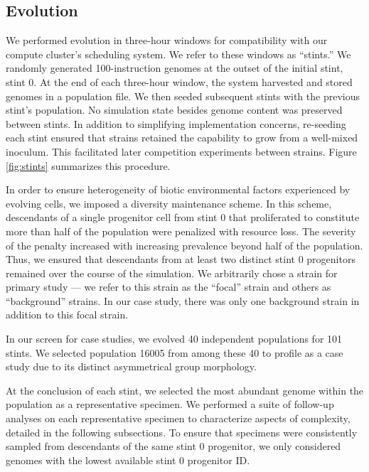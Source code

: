 
\subsection{Evolution}
\label{sec:evolution;ch:measuring-cna}



We performed evolution in three-hour windows for compatibility with our compute cluster's scheduling system.
We refer to these windows as ``stints.''
We randomly generated 100-instruction genomes at the outset of the initial stint, stint 0.
At the end of each three-hour window, the system harvested and stored genomes in a population file.
We then seeded subsequent stints with the previous stint's population.
No simulation state besides genome content was preserved between stints.
In addition to simplifying implementation concerns, re-seeding each stint ensured that strains retained the capability to grow from a well-mixed inoculum.
This facilitated later competition experiments between strains.
Figure \ref{fig:stints} summarizes this procedure.

In order to ensure heterogeneity of biotic environmental factors experienced by evolving cells, we imposed a diversity maintenance scheme.
In this scheme, descendants of a single progenitor cell from stint 0 that proliferated to constitute more than half of the population were penalized with resource loss.
The severity of the penalty increased with increasing prevalence beyond half of the population.
Thus, we ensured that descendants from at least two distinct stint 0 progenitors remained over the course of the simulation.
We arbitrarily chose a strain for primary study --- we refer to this strain as the ``focal'' strain and others as ``background'' strains.
In our case study, there was only one background strain in addition to this focal strain.

In our screen for case studies, we evolved 40 independent populations for 101 stints.
We selected population 16005 from among these 40 to profile as a case study due to its distinct asymmetrical group morphology.

At the conclusion of each stint, we selected the most abundant genome within the population as a representative specimen.
We performed a suite of follow-up analyses on each representative specimen to characterize aspects of complexity, detailed in the following subsections.
To ensure that specimens were consistently sampled from descendants of the same stint 0 progenitor, we only considered genomes with the lowest available stint 0 progenitor ID.

